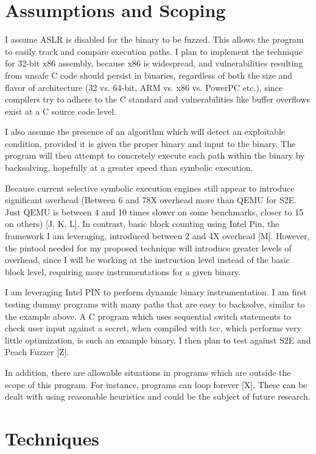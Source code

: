 \documentclass[11pt,expanded,copyright]{fsuthesis}
\begin{document}
\chapter{Assumptions and Scoping}

I assume ASLR is disabled for the binary to be fuzzed. This allows the program to easily track and compare execution paths. I plan to implement the technique for 32-bit x86 assembly, because x86 is widespread, and vulnerabilities resulting from unsafe C code should persist in binaries, regardless of both the size and flavor of architecture (32 vs. 64-bit, ARM vs. x86 vs. PowerPC etc.), since compilers try to adhere to the C standard and vulnerabilities like buffer overflows exist at a C source code level.

I also assume the presence of an algorithm which will detect an exploitable condition, provided it is given the proper binary and input to the binary. The program will then attempt to concretely execute each path within the binary by backsolving, hopefully at a greater speed than symbolic execution. 

Because current selective symbolic execution engines still appear to introduce significant overhead (Between 6 and 78X overhead more than QEMU for S2E. Just QEMU is between 4 and 10 times slower on some benchmarks, closer to 15 on others) [J, K, L]. In contrast, basic block counting using Intel Pin, the framework I am leveraging, introduced between 2 and 4X overhead [M]. However, the pintool needed for my proposed technique will introduce greater levels of overhead, since I will be working at the instruction level instead of the basic block level, requiring more instrumentations for a given binary.

I am leveraging Intel PIN to perform dynamic binary instrumentation. I am first testing dummy programs with many paths that are easy to backsolve, similar to the example above. A C program which uses sequential switch statements to check user input against a secret, when compiled with tcc, which performs very little optimization, is such an example binary. I then plan to test against S2E and Peach Fuzzer [Z]. 

In addition, there are allowable situations in programs which are outside the scope of this program. For instance, programs can loop forever [X]. These can be dealt with using reasonable heuristics and could be the subject of future research.

\chapter{Techniques}
\end{document}
